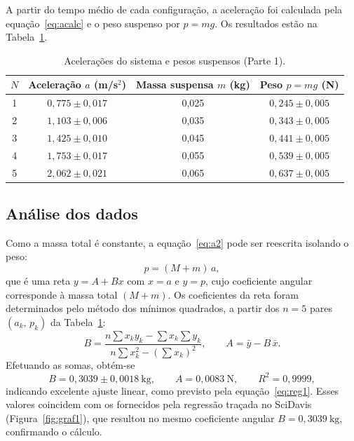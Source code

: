 \documentclass[12pt,a4paper]{article}
\begin{document}
A partir do tempo médio de cada configuração, a aceleração foi calculada pela
equação~\eqref{eq:acalc} e o peso suspenso por $p = mg$. Os resultados estão na
Tabela~\ref{tab:acel1}.

\begin{table}[!h]
	\centering
	\begin{tabular}{|c|c|c|c|} \hline \hline
	$N$ & Aceleração $a$ (m/s$^2$) & Massa suspensa $m$ (kg) & Peso $p=mg$ (N) \\ \hline \hline
	1 & $0{,}775 \pm 0{,}017$ & 0,025 & $0{,}245 \pm 0{,}005$ \\ \hline
	2 & $1{,}103 \pm 0{,}006$ & 0,035 & $0{,}343 \pm 0{,}005$ \\ \hline
	3 & $1{,}425 \pm 0{,}010$ & 0,045 & $0{,}441 \pm 0{,}005$ \\ \hline
	4 & $1{,}753 \pm 0{,}017$ & 0,055 & $0{,}539 \pm 0{,}005$ \\ \hline
	5 & $2{,}062 \pm 0{,}021$ & 0,065 & $0{,}637 \pm 0{,}005$ \\ \hline \hline
	\end{tabular}
	\caption{Acelerações do sistema e pesos suspensos (Parte 1).}
	\label{tab:acel1}
\end{table}

\subsection{Análise dos dados}
Como a massa total é constante, a equação~\eqref{eq:a2} pode ser reescrita isolando o peso:
\begin{equation}
\label{eq:reg1}
p = (M+m)\,a,
\end{equation}
que é uma reta $y = A + Bx$ com $x = a$ e $y = p$, cujo coeficiente angular corresponde à massa
total $(M+m)$. Os coeficientes da reta foram determinados pelo método dos mínimos quadrados, a
partir dos $n = 5$ pares $(a_k,\,p_k)$ da Tabela~\ref{tab:acel1}:
\begin{equation}
\label{eq:minquad}
B = \frac{n\sum x_k y_k - \sum x_k \sum y_k}{n\sum x_k^2 - \left(\sum x_k\right)^2},
\qquad
A = \bar{y} - B\,\bar{x}.
\end{equation}
Efetuando as somas, obtém-se
\[
B = 0{,}3039 \pm 0{,}0018~\mathrm{kg}, \qquad A = 0{,}0083~\mathrm{N}, \qquad R^2 = 0{,}9999,
\]
indicando excelente ajuste linear, como previsto pela equação~\eqref{eq:reg1}. Esses valores
coincidem com os fornecidos pela regressão traçada no SciDavis (Figura~\ref{fig:graf1}), que
resultou no mesmo coeficiente angular $B = 0{,}3039~\mathrm{kg}$, confirmando o cálculo.
\end{document}
